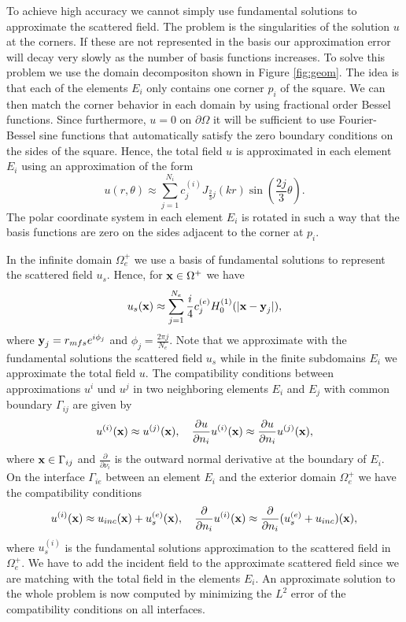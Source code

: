 To achieve high accuracy we cannot simply use fundamental solutions
to approximate the scattered field. The problem is the singularities
of the solution $u$ at the corners. If these are not represented in
the basis our approximation error will decay very slowly as the number
of basis functions increases. To solve this problem we use the domain
decompositon shown in Figure \ref{fig:geom}. The idea is that each of
the elements $E_i$ only contains one corner $p_i$ of the square. We can then
match the corner behavior in each domain by using fractional order
Bessel functions. Since furthermore, $u=0$ on $\partial\Omega$ it will
be sufficient to use Fourier-Bessel sine functions that automatically
satisfy the zero boundary conditions on the sides of the square.
Hence, the total field $u$ is approximated in each element $E_i$ using
an approximation of the form
$$
u(r,\theta)\approx
\sum_{j=1}^{N_i}c_j^{(i)}J_{\frac{2}{3}j}(kr)\sin(\frac{2j}{3}\theta).
$$
The polar coordinate system in each element $E_i$ is rotated in such a way
that the basis functions are zero on the sides adjacent to the corner
at $p_i$.

In the infinite domain $\Omega_e^+$ we use a basis of fundamental
solutions to represent the scattered field $u_s$. Hence, for
$\textbf{x}\in\Omega^+$ we have
$$
u_s(\textbf{x})\approx \sum_{j=1}^{N_e}\frac{i}{4}c_j^{(e)}H_0^{(1)}(|\textbf{x}-\textbf{y}_j|),
$$
where $\textbf{y}_j=r_{mfs}e^{i\phi_j}$ and $\phi_j=\frac{2\pi j}{N_e}$. Note
that we approximate with the fundamental solutions the scattered field
$u_s$ while in the finite subdomains $E_i$ we approximate the total
field $u$. The compatibility conditions between approximations $u^{i}$
und $u^{j}$ in two neighboring elements $E_i$ and $E_j$ with common
boundary $\Gamma_{ij}$ are given by
$$
u^{(i)}(\textbf{x})\approx u^{(j)}(\textbf{x}),\quad \frac{\partial u}{\partial
  n_i}{u^{(i)}}(\textbf{x})\approx  \frac{\partial u}{\partial
  n_i}{u^{(j)}}(\textbf{x}),
$$
where $\textbf{x}\in\Gamma_{ij}$ and $\frac{\partial}{\partial\nu_i}$ is the
outward normal derivative at the boundary of $E_i$.
On the interface $\Gamma_{ie}$ between an element $E_i$ and the
exterior domain $\Omega_e^{+}$ we have the compatibility conditions
$$
u^{(i)}(\textbf{x})\approx u_{inc}(\textbf{x})+u_s^{(e)}(\textbf{x}),\quad \frac{\partial}{\partial
  n_i}{u^{(i)}}(\textbf{x})\approx  \frac{\partial}{\partial
  n_i}{(u_s^{(e)}+u_{inc})}(\textbf{x}),
$$
where $u_s^{(i)}$ is the fundamental solutions approximation to the
scattered field in $\Omega_e^{+}$. We have to add the incident field
to the approximate scattered field since we are matching with the
total field in the elements $E_i$.
An approximate solution to the whole problem is now 
computed by minimizing the $L^2$ error of 
the compatibility conditions on all interfaces.

